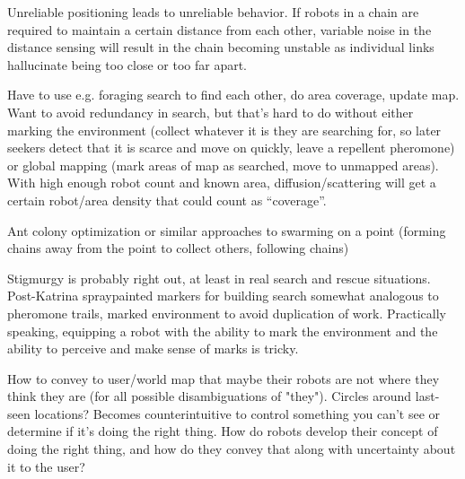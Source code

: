 \documentclass[]{article}
\begin{document}
Unreliable positioning leads to unreliable behavior. If robots in a chain are required to maintain a certain distance from each other, variable noise in the distance sensing will result in the chain becoming unstable as individual links hallucinate being too close or too far apart. 

Have to use e.g. foraging search to find each other, do area coverage, update map. Want to avoid redundancy in search, but that's hard to do without either marking the environment (collect whatever it is they are searching for, so later seekers detect that it is scarce and move on quickly, leave a repellent pheromone) or global mapping (mark areas of map as searched, move to unmapped areas). With high enough robot count and known area, diffusion/scattering will get a certain robot/area density that could count as ``coverage''. 

Ant colony optimization or similar approaches to swarming on a point (forming chains away from the point to collect others, following chains)

Stigmurgy is probably right out, at least in real search and rescue situations. Post-Katrina spraypainted markers for building search somewhat analogous to pheromone trails, marked environment to avoid duplication of work. Practically speaking, equipping a robot with the ability to mark the environment and the ability to perceive and make sense of marks is tricky.  

How to convey to user/world map that maybe their robots are not where they think they are (for all possible disambiguations of "they"). Circles around last-seen locations? Becomes counterintuitive to control something you can't see or determine if it's doing the right thing. How do robots develop their concept of doing the right thing, and how do they convey that along with uncertainty about it to the user?




\end{document}
